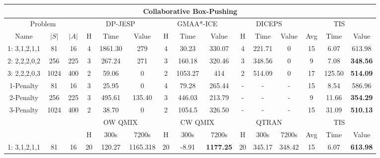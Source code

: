 \documentclass[runningheads]{llncs}
\newcommand{\cbp}[0]{Collaborative Box-Pushing}
\begin{document}
\begin{table}[t]
\centering
    \scriptsize
    \begin{tabular}{|c|c|c||c|c|c||c|c|c||c|c|c||c|c|c||}
         \hline
          \multicolumn{15}{|c|}{\cbp} \\
         \hline
         \multicolumn{3}{|c||}{Problem} &\multicolumn{3}{|c||}{DP-JESP} & \multicolumn{3}{c||}{GMAA*-ICE} & \multicolumn{3}{|c||}{DICEPS} & \multicolumn{3}{c||}{TIS} \\
         \hline
         Name&$|S|$ & $|A|$ & H & Time & Value & H & Time & Value & H & Time & Value & Avg & Time & Value\\
         \hline\hline
        
         1: 3,1,2,1,1&81&16& 4 & 1861.30 & 279 & 4 & 30.23 & 330.07 & 4 & 221.71 & 0 & 15 & 6.07 & 613.98  \\
         
         \hline
         
 
         2: 2,2,2,0,2&256 & 225   &3 & 267.24 & 271 & 3 & 160.18 & 320.46 & 3  & 348.56 & 0 & 9 & 7.08 & \textbf{348.56} \\
         \hline
         
         
         
         \hline
         3: 2,2,2,0,3& 1024 & 400  &2 & 59.06 & 0 & 2 & 1053.27 & 414 & 2 & 514.09 & 0 & 17 & 125.50 & \textbf{514.09}  \\
         \hline
         1-Penalty &81&16& 3 & 25.95 & 0 & 4 & 79.28 & 265.44 & - & - & - 
         & 15 & 8.54 & 586.96 \\
         \hline 

         2-Penalty &256 & 225 & 3 & 495.61 & 135.40 & 3 & 446.03 & 213.79  & - & - & -  &  9 & 11.66 & \textbf{354.29} \\
         \hline 
         
         3-Penalty & 1024 & 400 & 2 & 38.70 & 0 & 2 & 1054.5 & 326.50 & - & - & -  & 15 & 31.09 & \textbf{510.13}  \\
         
         
         \hline
                  \hline
                  
        \multicolumn{3}{|c||}{} &\multicolumn{3}{|c||}{OW QMIX} & \multicolumn{3}{c||}{CW QMIX} & \multicolumn{3}{c||}{QTRAN} & \multicolumn{3}{c||}{TIS}\\

         \hline 
        \multicolumn{3}{|c||}{} & H & 300s & 7200s & H & 300s & 7200s & H & 300s & 7200s & Avg & Time & Value\\
         \hline
         1: 3,1,2,1,1&81&16 & 20 & 120.27 & 1165.318 & 20 & -8.91 & \textbf{1177.25} & 20 & 345.17 & 348.42  & 15 & 6.07 & {\bf 613.98} \\
         

\end{tabular}
\end{table}
\end{document}
